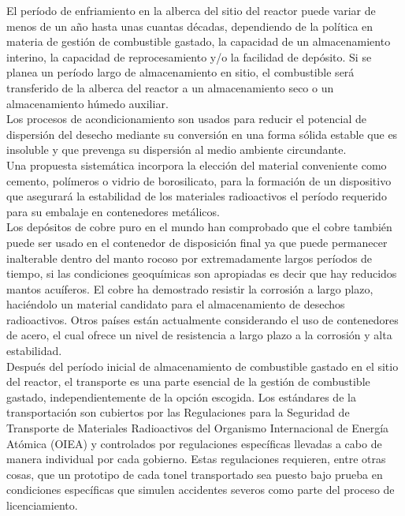 \documentclass[]{article}
\begin{document}
El período de enfriamiento en la alberca del  sitio del reactor puede variar de menos de un año hasta unas cuantas décadas, dependiendo de la política en materia de gestión  de combustible gastado, la capacidad de un almacenamiento interino, la capacidad de reprocesamiento y/o la facilidad de depósito. Si se planea  un período largo de almacenamiento en sitio, el combustible será transferido de la alberca del reactor a un almacenamiento seco o un almacenamiento húmedo auxiliar.\\

Los procesos de acondicionamiento son usados para reducir el potencial de dispersión del desecho mediante su conversión en una forma sólida estable que es insoluble y que prevenga su dispersión al medio ambiente circundante.\\

 Una propuesta sistemática incorpora la elección del material conveniente como cemento, polímeros o  vidrio de borosilicato, para la formación de un dispositivo que asegurará la estabilidad de los materiales radioactivos el período requerido para su embalaje en contenedores metálicos.\\

Los depósitos de cobre puro en el mundo han comprobado que el cobre también puede ser usado en el contenedor de disposición final ya que puede permanecer  inalterable dentro del manto rocoso por extremadamente largos períodos de tiempo, si las condiciones geoquímicas son apropiadas es decir que hay reducidos mantos acuíferos. El cobre ha demostrado resistir la corrosión a largo plazo, haciéndolo un material candidato para el almacenamiento de desechos radioactivos. Otros países están actualmente considerando el uso de contenedores de acero, el cual ofrece un nivel de resistencia a largo plazo a la corrosión y alta estabilidad.\\

Después del período inicial de almacenamiento de combustible gastado en el sitio del reactor, el transporte es una parte esencial de la gestión de combustible gastado, independientemente de la opción escogida. Los estándares de la transportación son cubiertos por las Regulaciones para la Seguridad de Transporte de Materiales Radioactivos del Organismo Internacional de Energía Atómica (OIEA) y controlados por regulaciones específicas llevadas a cabo de manera individual por cada gobierno. Estas regulaciones requieren, entre otras cosas, que un prototipo de cada tonel transportado sea puesto bajo prueba  en condiciones específicas que simulen accidentes severos como parte del proceso de licenciamiento.\\
\end{document}
